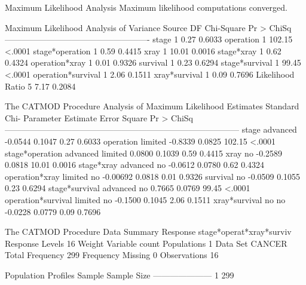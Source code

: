 \documentclass{article}
\begin{document}
\begin{Woutput}
                   Maximum Likelihood Analysis
           Maximum likelihood computations converged.

      Maximum Likelihood Analysis of Variance
Source                 DF   Chi-Square    Pr > ChiSq
----------------------------------------------------
stage                   1         0.27        0.6033
operation               1       102.15        <.0001
stage*operation         1         0.59        0.4415
xray                    1        10.01        0.0016
stage*xray              1         0.62        0.4324
operation*xray          1         0.01        0.9326
survival                1         0.23        0.6294
stage*survival          1        99.45        <.0001
operation*survival      1         2.06        0.1511
xray*survival           1         0.09        0.7696
Likelihood Ratio        5         7.17        0.2084

The CATMOD Procedure
                      Analysis of Maximum Likelihood Estimates
                                                  Standard        Chi-
Parameter                              Estimate      Error      Square    Pr > ChiSq
------------------------------------------------------------------------------------
stage              advanced             -0.0544     0.1047        0.27        0.6033
operation          limited              -0.8339     0.0825      102.15        <.0001
stage*operation    advanced limited      0.0800     0.1039        0.59        0.4415
xray               no                   -0.2589     0.0818       10.01        0.0016
stage*xray         advanced no          -0.0612     0.0780        0.62        0.4324
operation*xray     limited no          -0.00692     0.0818        0.01        0.9326
survival           no                   -0.0509     0.1055        0.23        0.6294
stage*survival     advanced no           0.7665     0.0769       99.45        <.0001
operation*survival limited no           -0.1500     0.1045        2.06        0.1511
xray*survival      no no                -0.0228     0.0779        0.09        0.7696

The CATMOD Procedure
                            Data Summary
Response           stage*operat*xray*surviv     Response Levels   16
Weight Variable    count                        Populations        1
Data Set           CANCER                       Total Frequency  299
Frequency Missing  0                            Observations      16

 Population Profiles
Sample    Sample Size
---------------------
    1             299


\end{Woutput}
\end{document}
